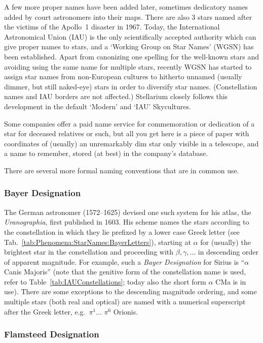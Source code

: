 A few more proper names have been added later, sometimes dedicatory
names added by court astronomers into their maps. There are also 3
stars named after the victims of the Apollo~1 disaster in 1967.
Today, the International Astronomical Union (IAU) is the only
scientifically accepted authority which can give proper names to
stars, and a `Working Group on Star Names' (WGSN) has been established. 
Apart from canonizing one spelling for the well-known stars and avoiding using the same name for multiple stars, 
recently WGSN has started to assign star names from non-European cultures to hitherto unnamed 
(usually dimmer, but still naked-eye) stars in order to diversify star names. 
(Constellation names and IAU borders are not affected.) 
Stellarium closely follows this development in the default `Modern' and `IAU' Skycultures.

Some companies offer a paid name service for commemoration or
dedication of a star for deceased relatives or such, but all you get
here is a piece of paper with coordinates of (usually) an unremarkably
dim star only visible in a telescope, and a name to remember, stored
(at best) in the company's database.

There are several more formal naming conventions that are in common use.

\subsubsection{Bayer Designation}
\label{sec:Phenomena:StarNames:Bayer}

The German astronomer  (1572--1625) devised one
such system for his atlas, the \emph{Uranographia}, first published in
1603. His scheme names the stars according to the constellation in
which they lie prefixed by a lower case Greek letter (see
Tab.~\ref{tab:Phenomena:StarNames:BayerLetters}), starting at $\alpha$
for (usually) the brightest star in the constellation and proceeding
with $\beta, \gamma, \ldots$ in descending order of apparent
magnitude. For example, such a \emph{Bayer Designation} for Sirius is
``$\alpha$ Canis Majoris'' (note that the genitive form of the
constellation name is used, refer to Table~\ref{tab:IAUConstellations};
today also the short form $\alpha$ CMa is in use).
There are some exceptions to the descending magnitude
ordering, and some multiple stars (both real and optical) are named
with a numerical superscript after the Greek letter, e.g.\ $\pi^1$...
$\pi^6$ Orionis.


\subsubsection{Flamsteed Designation}
\label{sec:Phenomena:StarNames:Flamsteed}

